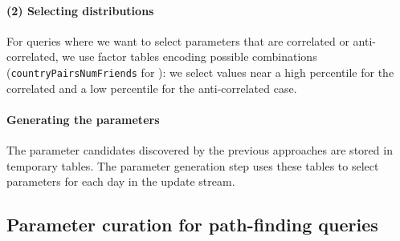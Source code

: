 \paragraph{(2) Selecting distributions}
%
For queries where we want to select parameters that are correlated or anti-correlated, we use factor tables encoding possible combinations (\eg \texttt{countryPairsNumFriends} for \CR[3]):
we select values near a high percentile for the correlated and a low percentile for the anti-correlated case.

\paragraph{Generating the parameters}
%
The parameter candidates discovered by the previous approaches are stored in temporary tables.
The parameter generation step uses these tables to select parameters for each day in the update stream.




\subsection{Parameter curation for path-finding queries}
\label{sec:path-curation}

